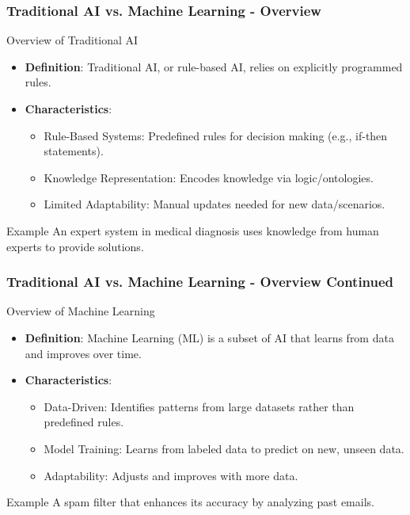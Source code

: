 \documentclass[aspectratio=169]{beamer}
\begin{document}
\begin{frame}[fragile]
    \frametitle{Traditional AI vs. Machine Learning - Overview}
    \begin{block}{Overview of Traditional AI}
        \begin{itemize}
            \item \textbf{Definition}: Traditional AI, or rule-based AI, relies on explicitly programmed rules.
            \item \textbf{Characteristics}:
                \begin{itemize}
                    \item Rule-Based Systems: Predefined rules for decision making (e.g., if-then statements).
                    \item Knowledge Representation: Encodes knowledge via logic/ontologies.
                    \item Limited Adaptability: Manual updates needed for new data/scenarios.
                \end{itemize}
        \end{itemize}
    \end{block}
    \begin{block}{Example}
        An expert system in medical diagnosis uses knowledge from human experts to provide solutions.
    \end{block}
\end{frame}

\begin{frame}[fragile]
    \frametitle{Traditional AI vs. Machine Learning - Overview Continued}
    \begin{block}{Overview of Machine Learning}
        \begin{itemize}
            \item \textbf{Definition}: Machine Learning (ML) is a subset of AI that learns from data and improves over time.
            \item \textbf{Characteristics}:
                \begin{itemize}
                    \item Data-Driven: Identifies patterns from large datasets rather than predefined rules.
                    \item Model Training: Learns from labeled data to predict on new, unseen data.
                    \item Adaptability: Adjusts and improves with more data.
                \end{itemize}
        \end{itemize}
    \end{block}
    \begin{block}{Example}
        A spam filter that enhances its accuracy by analyzing past emails.
    \end{block}
\end{frame}
\end{document}
